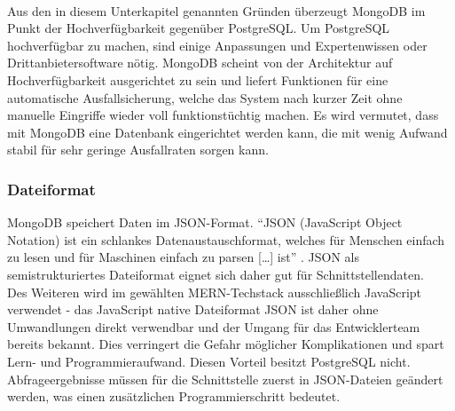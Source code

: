 \paragraph{}
Aus den in diesem Unterkapitel genannten Gründen überzeugt MongoDB im Punkt der Hochverfügbarkeit gegenüber PostgreSQL.
Um PostgreSQL hochverfügbar zu machen, sind einige Anpassungen und Expertenwissen oder Drittanbietersoftware nötig.
MongoDB scheint von der Architektur auf Hochverfügbarkeit ausgerichtet zu sein und liefert Funktionen für eine automatische Ausfallsicherung, welche das System nach kurzer Zeit ohne manuelle Eingriffe wieder voll funktionstüchtig machen.
Es wird vermutet, dass mit MongoDB eine Datenbank eingerichtet werden kann, die mit wenig Aufwand stabil für sehr geringe Ausfallraten sorgen kann.

\subsubsection{Dateiformat}
MongoDB speichert Daten im JSON-Format. 
\enquote{JSON (JavaScript Object Notation) ist ein schlankes Datenaustauschformat, welches für Menschen einfach zu lesen und für Maschinen einfach zu parsen [\dots] ist} \cite{db:json}. 
JSON als semistrukturiertes Dateiformat eignet sich daher gut für Schnittstellendaten.\\
Des Weiteren wird im gewählten MERN-Techstack ausschließlich JavaScript verwendet - das JavaScript native Dateiformat JSON ist daher ohne Umwandlungen direkt verwendbar und der Umgang für das Entwicklerteam bereits bekannt.
Dies verringert die Gefahr möglicher Komplikationen und spart Lern- und Programmieraufwand.
Diesen Vorteil besitzt PostgreSQL nicht.
Abfrageergebnisse müssen für die Schnittstelle zuerst in JSON-Dateien geändert werden, was einen zusätzlichen Programmierschritt bedeutet.

